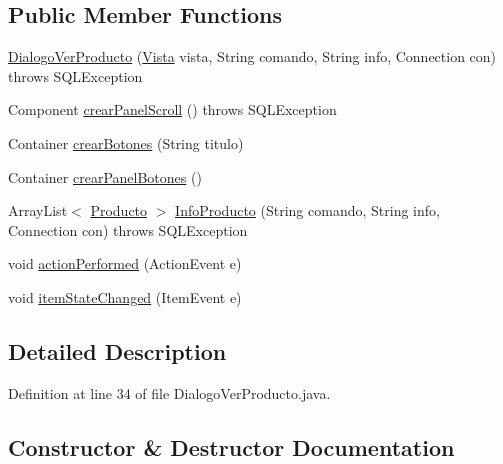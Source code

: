 \subsection*{Public Member Functions}
\begin{DoxyCompactItemize}
\item 
\mbox{\hyperlink{classsociedad2_1_1_dialogo_ver_producto_a487e0e9d7f6d8b34c62c77920e1db317}{Dialogo\+Ver\+Producto}} (\mbox{\hyperlink{classsociedad2_1_1_vista}{Vista}} vista, String comando, String info, Connection con)  throws S\+Q\+L\+Exception 
\item 
Component \mbox{\hyperlink{classsociedad2_1_1_dialogo_ver_producto_a14b7bf28144868d348c11cc781362b33}{crear\+Panel\+Scroll}} ()  throws S\+Q\+L\+Exception 
\item 
Container \mbox{\hyperlink{classsociedad2_1_1_dialogo_ver_producto_a614453b9afc5ce8151080134d1fe9ee9}{crear\+Botones}} (String titulo)
\item 
Container \mbox{\hyperlink{classsociedad2_1_1_dialogo_ver_producto_a38490a666f21e0b4656d42d3e2e0d56f}{crear\+Panel\+Botones}} ()
\item 
Array\+List$<$ \mbox{\hyperlink{classsociedad2_1_1_producto}{Producto}} $>$ \mbox{\hyperlink{classsociedad2_1_1_dialogo_ver_producto_a4de5041f6b98f27067d84875d96740ad}{Info\+Producto}} (String comando, String info, Connection con)  throws S\+Q\+L\+Exception 
\item 
void \mbox{\hyperlink{classsociedad2_1_1_dialogo_ver_producto_a5e631781eea3e411d84f9d4b61c51d99}{action\+Performed}} (Action\+Event e)
\item 
void \mbox{\hyperlink{classsociedad2_1_1_dialogo_ver_producto_a9c92fe26ec107a5105fe32f9a51c7502}{item\+State\+Changed}} (Item\+Event e)
\end{DoxyCompactItemize}


\subsection{Detailed Description}


Definition at line 34 of file Dialogo\+Ver\+Producto.\+java.



\subsection{Constructor \& Destructor Documentation}
\mbox{\label{classsociedad2_1_1_dialogo_ver_producto_a487e0e9d7f6d8b34c62c77920e1db317}} 
